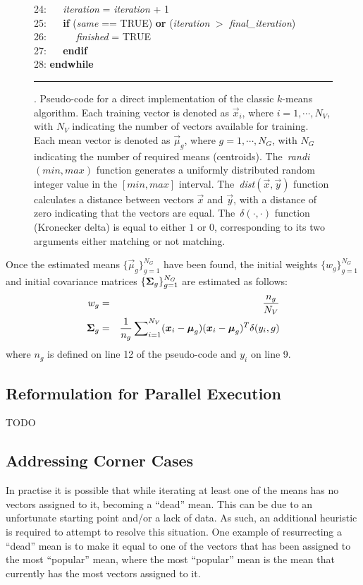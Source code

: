 \begin{figure}[!b]
\begin{small}
\begin{tabbing}
24: ~~ {\it iteration} = {\it iteration} + 1 \\
25: ~~ {\bf if} ({\it same} == TRUE) {\bf or} ({\it iteration} $>$ {\it final\_iteration})  \\
26: ~~ ~~ {\it finished} = TRUE \\
27: ~~ {\bf endif} \\
28: {\bf endwhile}
\end{tabbing}
\end{small}
\vspace{-1ex}
\hrule
\caption
  {
  \small
  .
  Pseudo-code for a direct implementation of the classic $k$-means algorithm.
  Each training vector is denoted as $\Vec{x}_i$, where $i = 1, \cdots, N_V$, with $N_V$ indicating the number of vectors available for training.
  Each mean vector is denoted as $\Vec{\mu}_g$, where $g = 1, \cdots, N_G$, with $N_G$ indicating the number of required means (centroids).
  The~{\it randi}$(min,max)$ function generates a uniformly distributed random integer value in the $[min,max]$ interval.
  The~{\it dist}$(\Vec{x},\Vec{y})$ function calculates a distance between vectors $\Vec{x}$ and $\Vec{y}$, with a distance of zero indicating that the vectors are equal.
  The~$\delta(\cdot,\cdot)$ function (Kronecker delta) is equal to either $1$ or $0$, corresponding to its two arguments either matching or not matching.
  }
\label{fig:kmeans_pseudocode}
\end{figure}

Once the estimated means $\{ \Vec{\mu}_g \}_{g=1}^{N_G}$ have been found,
the initial weights $\{ w_g \}_{g=1}^{N_G}$ and initial covariance matrices $\{ {{\boldsymbol{\Sigma}}_g} \}_{g=1}^{N_G}$
are estimated as follows:
%
\begin{eqnarray}
w_g & = & \frac{n_g}{N_V} \\
{\mbox {\boldmath $\Sigma$}_g} & = & \frac{1}{n_g} \sum\nolimits_{i=1}^{N_V} (\Vec{x}_i - \Vec{\mu}_g)(\Vec{x}_i - \Vec{\mu}_g)^T \delta(y_i, g)
\label{eqn:k-means_cov}
\end{eqnarray}
%
\noindent
where $n_g$ is defined on line 12 of the pseudo-code and $y_i$ on line 9.


\subsection{Reformulation for Parallel Execution}

TODO


\subsection{Addressing Corner Cases}

In practise it is possible that while iterating at least one of the means has no vectors assigned to it,
becoming a ``dead'' mean.
This can be due to an unfortunate starting point and/or a lack of data.
As such, an additional heuristic is required to attempt to resolve this situation.
One example of resurrecting a ``dead'' mean is to make it equal to one of the vectors
that has been assigned to the most ``popular'' mean,
where the most ``popular'' mean is the mean that currently has the most vectors assigned to it.

